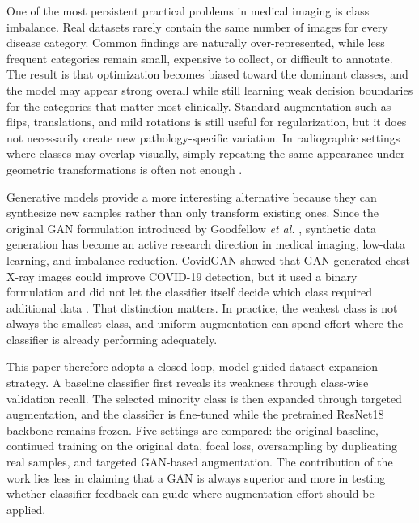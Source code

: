 \documentclass[conference]{IEEEtran}
\begin{document}
One of the most persistent practical problems in medical imaging is class imbalance. Real datasets rarely contain the same number of images for every disease category. Common findings are naturally over-represented, while less frequent categories remain small, expensive to collect, or difficult to annotate. The result is that optimization becomes biased toward the dominant classes, and the model may appear strong overall while still learning weak decision boundaries for the categories that matter most clinically. Standard augmentation such as flips, translations, and mild rotations is still useful for regularization, but it does not necessarily create new pathology-specific variation. In radiographic settings where classes may overlap visually, simply repeating the same appearance under geometric transformations is often not enough \cite{shorten2019,fridadar2018}.

Generative models provide a more interesting alternative because they can synthesize new samples rather than only transform existing ones. Since the original GAN formulation introduced by Goodfellow \textit{et al.} \cite{goodfellow2014}, synthetic data generation has become an active research direction in medical imaging, low-data learning, and imbalance reduction. CovidGAN showed that GAN-generated chest X-ray images could improve COVID-19 detection, but it used a binary formulation and did not let the classifier itself decide which class required additional data \cite{waheed2020}. That distinction matters. In practice, the weakest class is not always the smallest class, and uniform augmentation can spend effort where the classifier is already performing adequately.

This paper therefore adopts a closed-loop, model-guided dataset expansion strategy. A baseline classifier first reveals its weakness through class-wise validation recall. The selected minority class is then expanded through targeted augmentation, and the classifier is fine-tuned while the pretrained ResNet18 backbone remains frozen. Five settings are compared: the original baseline, continued training on the original data, focal loss, oversampling by duplicating real samples, and targeted GAN-based augmentation. The contribution of the work lies less in claiming that a GAN is always superior and more in testing whether classifier feedback can guide where augmentation effort should be applied.
\end{document}
